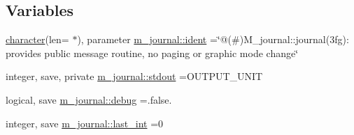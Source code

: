 \subsection*{Variables}
\begin{DoxyCompactItemize}
\item 
\hyperlink{option__stopwatch_83_8txt_abd4b21fbbd175834027b5224bfe97e66}{character}(len= $\ast$), parameter \hyperlink{namespacem__journal_a4e2131bb2d66050e0a9a37632579c9fc}{m\+\_\+journal\+::ident} =\char`\"{}@(\#)M\+\_\+journal\+::journal(3fg)\+: provides public message routine, no paging or graphic mode change\char`\"{}
\item 
integer, save, private \hyperlink{namespacem__journal_a664cf3fd85385b776d30ea589606ad1c}{m\+\_\+journal\+::stdout} =O\+U\+T\+P\+U\+T\+\_\+\+U\+N\+IT
\item 
logical, save \hyperlink{namespacem__journal_a6184fbcebdfa06f0a45ce4c699189b53}{m\+\_\+journal\+::debug} =.false.
\item 
integer, save \hyperlink{namespacem__journal_a47e8e34dc4072b04101027394d688519}{m\+\_\+journal\+::last\+\_\+int} =0
\end{DoxyCompactItemize}
